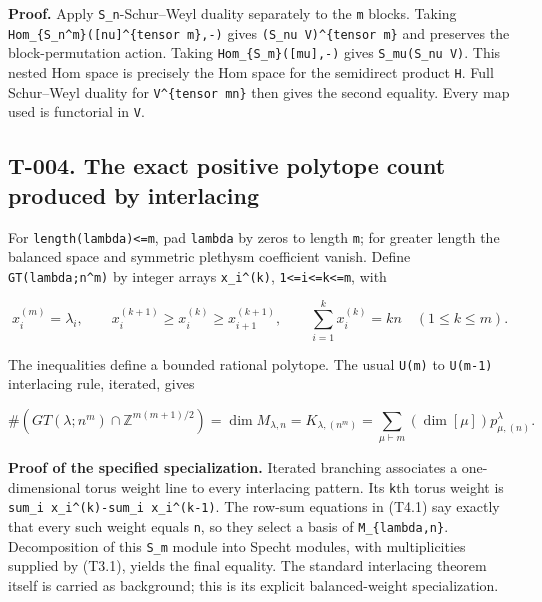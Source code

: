 \documentclass[
  10pt,
]{article}
\begin{document}
\textbf{Proof.} Apply \texttt{\small S\_\allowbreak{}n}-Schur--Weyl
duality separately to the \texttt{\small m} blocks. Taking
\texttt{\small Hom\_\allowbreak{}\{S\_\allowbreak{}n\textasciicircum{}m\}(\allowbreak{}[\allowbreak{}nu]\allowbreak{}\textasciicircum{}\{tensor m\},\allowbreak{}-\allowbreak{})\allowbreak{}}
gives
\texttt{\small (\allowbreak{}S\_\allowbreak{}nu V)\allowbreak{}\textasciicircum{}\{tensor m\}}
and preserves the block-permutation action. Taking
\texttt{\small Hom\_\allowbreak{}\{S\_\allowbreak{}m\}(\allowbreak{}[\allowbreak{}mu]\allowbreak{},\allowbreak{}-\allowbreak{})\allowbreak{}}
gives
\texttt{\small S\_\allowbreak{}mu(\allowbreak{}S\_\allowbreak{}nu V)\allowbreak{}}.
This nested Hom space is precisely the Hom space for the semidirect
product \texttt{\small H}. Full Schur--Weyl duality for
\texttt{\small V\textasciicircum{}\{tensor mn\}} then gives the second
equality. Every map used is functorial in \texttt{\small V}.

\subsection{T-004. The exact positive polytope count produced by
interlacing}\label{t-004.-the-exact-positive-polytope-count-produced-by-interlacing}

For
\texttt{\small length(\allowbreak{}lambda)\allowbreak{}<=\allowbreak{}m},
pad \texttt{\small lambda} by zeros to length \texttt{\small m}; for
greater length the balanced space and symmetric plethysm coefficient
vanish. Define
\texttt{\small GT(\allowbreak{}lambda;\allowbreak{}n\textasciicircum{}m)\allowbreak{}}
by integer arrays
\texttt{\small x\_\allowbreak{}i\textasciicircum{}(\allowbreak{}k)\allowbreak{}},
\texttt{\small 1<=\allowbreak{}i<=\allowbreak{}k<=\allowbreak{}m}, with

\[
x_i^{(m)}=\lambda_i,\qquad
x_i^{(k+1)}\ge x_i^{(k)}\ge x_{i+1}^{(k+1)},\qquad
\sum_{i=1}^k x_i^{(k)}=kn\quad(1\le k\le m).
\tag{T4.1}
\]

The inequalities define a bounded rational polytope. The usual
\texttt{\small U(\allowbreak{}m)\allowbreak{}} to
\texttt{\small U(\allowbreak{}m-\allowbreak{}1)\allowbreak{}}
interlacing rule, iterated, gives

\[
\#(GT(\lambda;n^m)\cap\mathbb Z^{m(m+1)/2})
=\dim M_{\lambda,n}
=K_{\lambda,(n^m)}
=\boxed{\sum_{\mu\vdash m}(\dim[\mu])p_{\mu,(n)}^\lambda}.
\tag{T4.2}
\]

\textbf{Proof of the specified specialization.} Iterated branching
associates a one-dimensional torus weight line to every interlacing
pattern. Its \texttt{\small k}th torus weight is
\texttt{\small sum\_\allowbreak{}i x\_\allowbreak{}i\textasciicircum{}(\allowbreak{}k)\allowbreak{}-\allowbreak{}sum\_\allowbreak{}i x\_\allowbreak{}i\textasciicircum{}(\allowbreak{}k-\allowbreak{}1)\allowbreak{}}.
The row-sum equations in (T4.1) say exactly that every such weight
equals \texttt{\small n}, so they select a basis of
\texttt{\small M\_\allowbreak{}\{lambda,\allowbreak{}n\}}. Decomposition
of this \texttt{\small S\_\allowbreak{}m} module into Specht modules,
with multiplicities supplied by (T3.1), yields the final equality. The
standard interlacing theorem itself is carried as background; this is
its explicit balanced-weight specialization.
\end{document}

